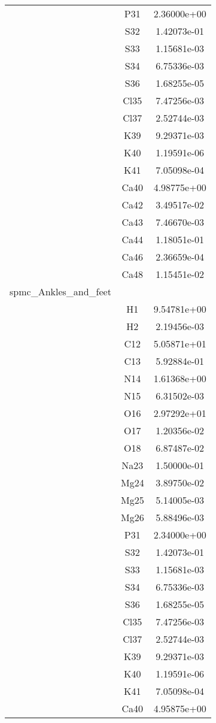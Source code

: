 \begin{centering}
\begin{longtable}{l c c}
& P31 & 2.36000e+00 \\ 
& S32 & 1.42073e-01 \\ 
& S33 & 1.15681e-03 \\ 
& S34 & 6.75336e-03 \\ 
& S36 & 1.68255e-05 \\ 
& Cl35 & 7.47256e-03 \\ 
& Cl37 & 2.52744e-03 \\ 
& K39 & 9.29371e-03 \\ 
& K40 & 1.19591e-06 \\ 
& K41 & 7.05098e-04 \\ 
& Ca40 & 4.98775e+00 \\ 
& Ca42 & 3.49517e-02 \\ 
& Ca43 & 7.46670e-03 \\ 
& Ca44 & 1.18051e-01 \\ 
& Ca46 & 2.36659e-04 \\ 
& Ca48 & 1.15451e-02 \\ 
\hline
spmc_Ankles_and_feet & & \\
\hline
& H1 & 9.54781e+00 \\ 
& H2 & 2.19456e-03 \\ 
& C12 & 5.05871e+01 \\ 
& C13 & 5.92884e-01 \\ 
& N14 & 1.61368e+00 \\ 
& N15 & 6.31502e-03 \\ 
& O16 & 2.97292e+01 \\ 
& O17 & 1.20356e-02 \\ 
& O18 & 6.87487e-02 \\ 
& Na23 & 1.50000e-01 \\ 
& Mg24 & 3.89750e-02 \\ 
& Mg25 & 5.14005e-03 \\ 
& Mg26 & 5.88496e-03 \\ 
& P31 & 2.34000e+00 \\ 
& S32 & 1.42073e-01 \\ 
& S33 & 1.15681e-03 \\ 
& S34 & 6.75336e-03 \\ 
& S36 & 1.68255e-05 \\ 
& Cl35 & 7.47256e-03 \\ 
& Cl37 & 2.52744e-03 \\ 
& K39 & 9.29371e-03 \\ 
& K40 & 1.19591e-06 \\ 
& K41 & 7.05098e-04 \\ 
& Ca40 & 4.95875e+00 \\ 

\end{longtable}
\end{centering}
